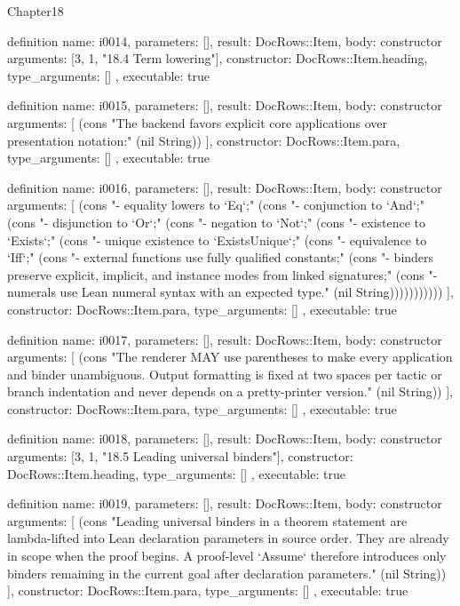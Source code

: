 \begin{lexlean}{Chapter18}
\begin{semanticmodule}
definition{
  name: i0014,
  parameters: [],
  result: DocRows::Item,
  body: constructor{
    arguments: [3, 1, "18.4 Term lowering"],
    constructor: DocRows::Item.heading,
    type_arguments: []
  },
  executable: true
}

definition{
  name: i0015,
  parameters: [],
  result: DocRows::Item,
  body: constructor{
    arguments: [
      (cons "The backend favors explicit core applications over presentation notation:" (nil String))
    ],
    constructor: DocRows::Item.para,
    type_arguments: []
  },
  executable: true
}

definition{
  name: i0016,
  parameters: [],
  result: DocRows::Item,
  body: constructor{
    arguments: [
      (cons "- equality lowers to `Eq`;" (cons "- conjunction to `And`;" (cons "- disjunction to `Or`;" (cons "- negation to `Not`;" (cons "- existence to `Exists`;" (cons "- unique existence to `ExistsUnique`;" (cons "- equivalence to `Iff`;" (cons "- external functions use fully qualified constants;" (cons "- binders preserve explicit, implicit, and instance modes from linked signatures;" (cons "- numerals use Lean numeral syntax with an expected type." (nil String)))))))))))
    ],
    constructor: DocRows::Item.para,
    type_arguments: []
  },
  executable: true
}

definition{
  name: i0017,
  parameters: [],
  result: DocRows::Item,
  body: constructor{
    arguments: [
      (cons "The renderer MAY use parentheses to make every application and binder unambiguous. Output formatting is fixed at two spaces per tactic or branch indentation and never depends on a pretty-printer version." (nil String))
    ],
    constructor: DocRows::Item.para,
    type_arguments: []
  },
  executable: true
}

definition{
  name: i0018,
  parameters: [],
  result: DocRows::Item,
  body: constructor{
    arguments: [3, 1, "18.5 Leading universal binders"],
    constructor: DocRows::Item.heading,
    type_arguments: []
  },
  executable: true
}

definition{
  name: i0019,
  parameters: [],
  result: DocRows::Item,
  body: constructor{
    arguments: [
      (cons "Leading universal binders in a theorem statement are lambda-lifted into Lean declaration parameters in source order. They are already in scope when the proof begins. A proof-level `Assume` therefore introduces only binders remaining in the current goal after declaration parameters." (nil String))
    ],
    constructor: DocRows::Item.para,
    type_arguments: []
  },
  executable: true
}


\end{semanticmodule}
\end{lexlean}
